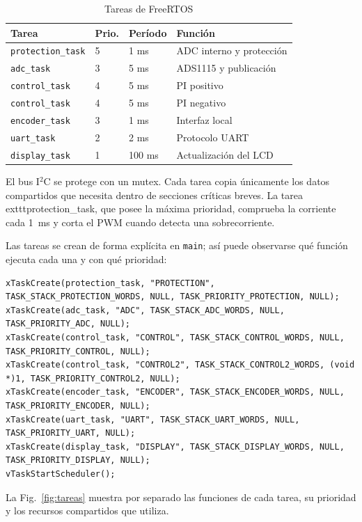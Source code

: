 \documentclass[conference]{IEEEtran}
\begin{document}
\begin{table}[!t]
\caption{Tareas de FreeRTOS}
\label{tab:tareas}
\centering
\scriptsize
\begin{tabular}{@{}llll@{}}
\toprule
\textbf{Tarea} & \textbf{Prio.} & \textbf{Período} & \textbf{Función} \\
\midrule
\texttt{protection\_task} & 5 & 1 ms & ADC interno y protección \\
\texttt{adc\_task} & 3 & 5 ms & ADS1115 y publicación \\
\texttt{control\_task} & 4 & 5 ms & PI positivo \\
\texttt{control\_task} & 4 & 5 ms & PI negativo \\
\texttt{encoder\_task} & 3 & 1 ms & Interfaz local \\
\texttt{uart\_task} & 2 & 2 ms & Protocolo UART \\
\texttt{display\_task} & 1 & 100 ms & Actualización del LCD \\
\bottomrule
\end{tabular}
\end{table}

El bus I$^2$C se protege con un mutex. Cada tarea copia únicamente los datos compartidos que necesita dentro de secciones críticas breves. La tarea 	exttt{protection\_task}, que posee la máxima prioridad, comprueba la corriente cada 1~ms y corta el PWM cuando detecta una sobrecorriente.

Las tareas se crean de forma explícita en \texttt{main}; así puede observarse qué función ejecuta cada una y con qué prioridad:

\begin{lstlisting}[caption={Creación de las siete tareas del programa principal.}]
xTaskCreate(protection_task, "PROTECTION", TASK_STACK_PROTECTION_WORDS, NULL, TASK_PRIORITY_PROTECTION, NULL);
xTaskCreate(adc_task, "ADC", TASK_STACK_ADC_WORDS, NULL, TASK_PRIORITY_ADC, NULL);
xTaskCreate(control_task, "CONTROL", TASK_STACK_CONTROL_WORDS, NULL, TASK_PRIORITY_CONTROL, NULL);
xTaskCreate(control_task, "CONTROL2", TASK_STACK_CONTROL2_WORDS, (void *)1, TASK_PRIORITY_CONTROL2, NULL);
xTaskCreate(encoder_task, "ENCODER", TASK_STACK_ENCODER_WORDS, NULL, TASK_PRIORITY_ENCODER, NULL);
xTaskCreate(uart_task, "UART", TASK_STACK_UART_WORDS, NULL, TASK_PRIORITY_UART, NULL);
xTaskCreate(display_task, "DISPLAY", TASK_STACK_DISPLAY_WORDS, NULL, TASK_PRIORITY_DISPLAY, NULL);
vTaskStartScheduler();
\end{lstlisting}

La Fig.~\ref{fig:tareas} muestra por separado las funciones de cada tarea, su prioridad y los recursos compartidos que utiliza.
\end{document}
